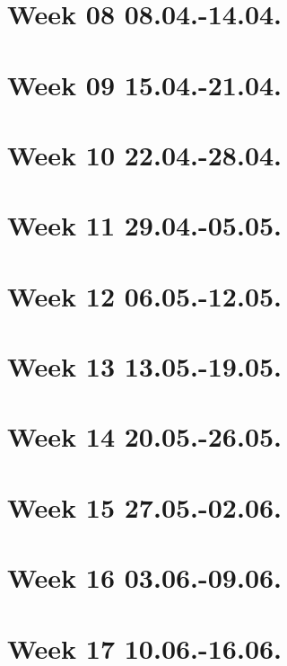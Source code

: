 \section{Week 08 08.04.-14.04.}
\label{sec:journal:week08}
\section{Week 09 15.04.-21.04.}
\label{sec:journal:week09}
\section{Week 10 22.04.-28.04.}
\label{sec:journal:week10}
\section{Week 11 29.04.-05.05.}
\label{sec:journal:week11}
\section{Week 12 06.05.-12.05.}
\label{sec:journal:week12}
\section{Week 13 13.05.-19.05.}
\label{sec:journal:week13}
\section{Week 14 20.05.-26.05.}
\label{sec:journal:week14}
\section{Week 15 27.05.-02.06.}
\label{sec:journal:week15}
\section{Week 16 03.06.-09.06.}
\label{sec:journal:week16}
\section{Week 17 10.06.-16.06.}
\label{sec:journal:week17}
